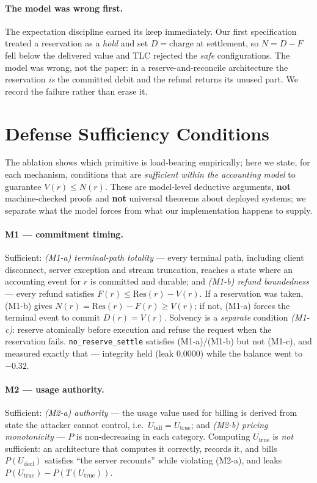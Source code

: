 \documentclass[11pt]{article}
\begin{document}
\paragraph{The model was wrong first.} The expectation discipline earned its keep
immediately. Our first specification treated a reservation as a \emph{hold} and set
$D=\mathrm{charge}$ at settlement, so $N=D-F$ fell below the delivered value and TLC
rejected the \emph{safe} configurations. The model was wrong, not the paper: in a
reserve-and-reconcile architecture the reservation \emph{is} the committed debit and the
refund returns its unused part. We record the failure rather than erase it.



\section{Defense Sufficiency Conditions}
\label{sec:sufficiency}
The ablation shows which primitive is load-bearing empirically; here we state, for each
mechanism, conditions that are \emph{sufficient within the accounting model} to guarantee
$V(r)\le N(r)$. These are model-level deductive arguments, \textbf{not} machine-checked
proofs and \textbf{not} universal theorems about deployed systems; we separate what the
model forces from what our implementation happens to supply.

\paragraph{M1 --- commitment timing.} Sufficient: \emph{(M1-a) terminal-path totality} ---
every terminal path, including client disconnect, server exception and stream truncation,
reaches a state where an accounting event for $r$ is committed and durable; and
\emph{(M1-b) refund boundedness} --- every refund satisfies
$F(r)\le \mathrm{Res}(r)-V(r)$. If a reservation was taken, (M1-b) gives
$N(r)=\mathrm{Res}(r)-F(r)\ge V(r)$; if not, (M1-a) forces the terminal event to commit
$D(r)=V(r)$. Solvency is a \emph{separate} condition \emph{(M1-c)}: reserve atomically
before execution and refuse the request when the reservation fails.
\texttt{no\_reserve\_settle} satisfies (M1-a)/(M1-b) but not (M1-c), and measured exactly
that --- integrity held (leak $0.0000$) while the balance went to $-0.32$.

\paragraph{M2 --- usage authority.} Sufficient: \emph{(M2-a) authority} --- the usage value
used for billing is derived from state the attacker cannot control, i.e.\
$U_{\text{bill}}=U_{\text{true}}$; and \emph{(M2-b) pricing monotonicity} --- $P$ is
non-decreasing in each category. Computing $U_{\text{true}}$ is \emph{not} sufficient: an
architecture that computes it correctly, records it, and bills $P(U_{\text{decl}})$
satisfies ``the server recounts'' while violating (M2-a), and leaks
$P(U_{\text{true}})-P(T(U_{\text{true}}))$.
\end{document}
